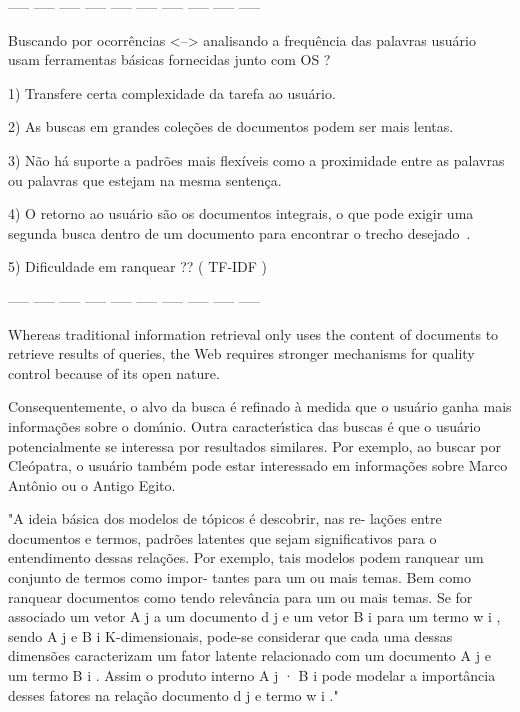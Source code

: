



----- ----- ----- ----- ----- ----- ----- ----- ----- -----


Buscando por ocorrências <--> analisando a frequência das palavras
usuário usam ferramentas básicas fornecidas junto com OS ?


1) Transfere certa complexidade da tarefa ao usuário.

2) As buscas em grandes coleções de documentos podem ser mais lentas. 

3) Não há suporte a padrões mais flexíveis como a proximidade entre as palavras ou palavras que estejam na mesma sentença.

4) O retorno ao usuário são os documentos integrais, o que pode exigir uma segunda busca dentro de um documento para encontrar o trecho desejado~\cite{Aggarwal2012,Manning2008}. 

5) Dificuldade em ranquear ?? ( TF-IDF )






----- ----- ----- ----- ----- ----- ----- ----- ----- ----- 


Whereas traditional information retrieval only uses the content of documents to
retrieve results of queries, the Web requires stronger mechanisms for quality control because
of its open nature.



Consequentemente, o alvo da busca é refinado à medida que o usuário ganha mais informações sobre o domı́nio. Outra caracterı́stica das buscas é que o usuário potencialmente se interessa por resultados similares. Por exemplo, ao buscar por Cleópatra, o usuário também pode estar interessado em informações sobre Marco Antônio ou o Antigo Egito.



"A ideia básica dos modelos de tópicos é descobrir, nas re- lações entre documentos e termos, padrões latentes que sejam significativos para o entendimento dessas relações. Por exemplo, tais modelos podem ranquear um conjunto de termos como impor- tantes para um ou mais temas. Bem como ranquear documentos como tendo relevância para um ou mais temas. Se for associado um vetor A j a um documento d j e um vetor B i para um termo w i , sendo A j e B i K-dimensionais, pode-se considerar que cada uma dessas dimensões caracterizam um fator latente relacionado com um documento A j e um termo B i . Assim o produto interno A j · B i pode modelar a importância desses fatores na relação documento d j e termo w i ."




